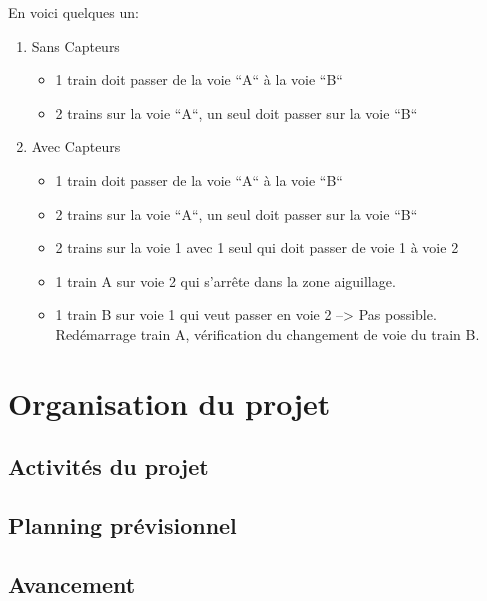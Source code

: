 En voici quelques un:

\begin{enumerate}[A]
  \item Sans Capteurs
  \begin{itemize}
    \item 1 train doit passer de la voie ``A`` à la voie ``B``
    \item 2 trains sur la voie ``A``, un seul doit passer sur la voie
       ``B``
  \end{itemize}

  \item Avec Capteurs
  \begin{itemize}
    \item 1 train doit passer de la voie ``A`` à la voie ``B``
    \item 2 trains sur la voie ``A``, un seul doit passer sur la voie ``B``
    \item 2 trains sur la voie 1 avec 1 seul qui doit passer de voie 1 à voie 2
    \item 1 train A sur voie 2 qui s'arrête dans la zone aiguillage.
    \item 1 train B sur voie 1 qui veut passer en voie 2 --> Pas
       possible. Redémarrage train A, vérification du changement de
       voie du train B.
  \end{itemize}
\end{enumerate}


\newpage
\section{Organisation du projet}
\label{sec:org_proj}

\subsection{Activités du projet}
\label{sec:activ}


\subsection{Planning prévisionnel}
\label{sec:planning}


\subsection{Avancement}
\label{sec:avanc}


\newpage




